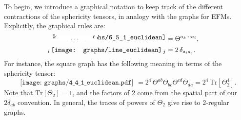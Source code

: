 \documentclass[aps,prd,floatfix,preprintnumbers,twocolumn,groupedaddress,nofootinbib,longbibliography,10pt]{revtex4-1}
\begin{document}
To begin, we introduce a graphical notation to keep track of the different contractions of the sphericity tensors, in analogy with the graphs for EFMs.
%
Explicitly, the graphical rules are:
%
\begin{align}
\begin{gathered}
\begin{tikzpicture}[      
        every node/.style={anchor=south west,inner sep=0pt},
        x=1mm, y=1mm,
      ]   
     \node (fig2) at (3,3)
       {\texttt{[image: graphs/6\_5\_1\_euclidean]}};  
     \draw [fill=patchcolor,patchcolor] (3,3) rectangle (26.5,5.75);
	\node[text width=0.05cm] at (3.75,3) {$^k$} ;
	\node[text width=0.05cm] at (13,3) {$\cdots$} ;
	\node[text width=0.05cm] at (24.25,3) {$^\ell$} ;
\end{tikzpicture}\end{gathered}  &= \Theta^{a_k \cdots a_\ell},\\
\label{eq:erule2}\begin{gathered}_i\,\texttt{[image: graphs/line\_euclidean]}\,_j\end{gathered} &= 2\,\delta_{a_ia_j}.
\end{align}
%
For instance, the square graph has the following meaning in terms of the sphericity tensor:
\begin{equation}
\label{eq:eucgraphs}
\begin{gathered}\texttt{[image: graphs/4\_4\_1\_euclidean.pdf]}\end{gathered}
=2^4\, \Theta^{ab}\Theta_{bc}\Theta^{cd}\Theta_{da} =2^4\, \text{Tr}[\Theta_2^4].
\end{equation}
%
Note that $\text{Tr}[\Theta_2]=1$, and the factors of 2 come from the spatial part of our $2\delta_{ab}$ convention.
%
In general, the traces of powers of $\Theta_2$ give rise to 2-regular graphs.
\end{document}
